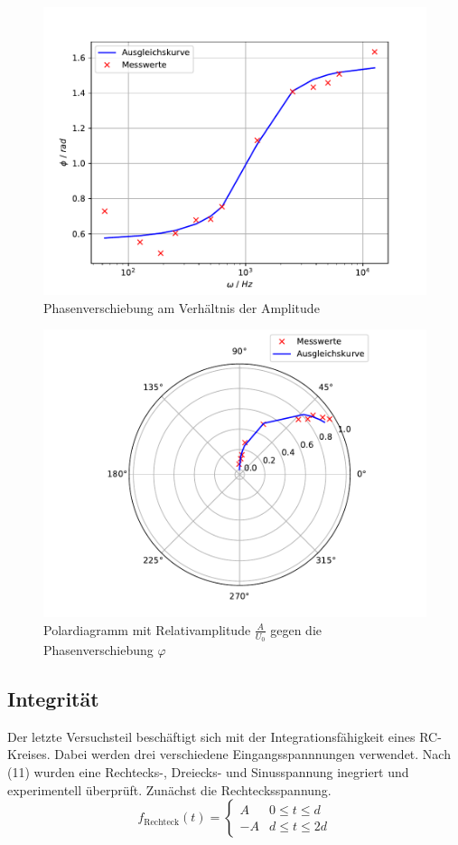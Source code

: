 \begin{figure}[h]
    \centering
    \includegraphics{Phasenverschiebung.pdf}
    \caption{Phasenverschiebung am Verhältnis der Amplitude}
    \label{fig:c}
\end{figure}
\begin{figure}[h]
    \centering
    \includegraphics{Polar.pdf}
    \caption{Polardiagramm mit Relativamplitude $\frac{A}{U_0}$ gegen die Phasenverschiebung $\varphi$}
    \label{fig:d}
\end{figure}

\subsection{Integrität}
Der letzte Versuchsteil beschäftigt sich mit der Integrationsfähigkeit eines RC-Kreises.
Dabei werden drei verschiedene Eingangsspannnungen verwendet.
Nach (11) wurden eine Rechtecks-, Dreiecks- und Sinusspannung inegriert und experimentell überprüft.
Zunächst die Rechtecksspannung.
\begin{equation}
	f_\text{Rechteck}(t)=\left\{\begin{array}{ll} A & 0 \leq t \leq d \\
		-A & d \leq t \leq 2d\end{array}\right.
\end{equation}

